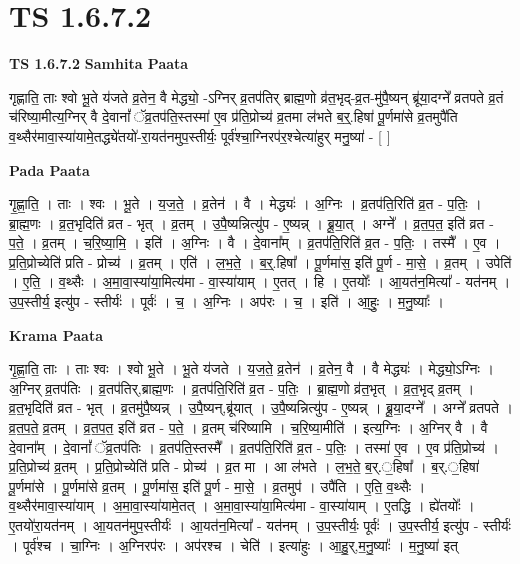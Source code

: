 \documentclass[17pt]{extarticle}
\begin{document}
\section{ TS 1.6.7.2 }

\textbf{TS 1.6.7.2 } \newline
\textbf{Samhita Paata} \newline

गृह्णाति॒ ताः श्वो भू॒ते य॑जते व्र॒तेन॒ वै मेद्ध्यो॒ -ऽग्निर् व्र॒तप॑तिर् ब्राह्म॒णो व्र॑त॒भृद्-व्र॒त-मु॑पै॒ष्यन् ब्रू॑या॒दग्ने᳚ व्रतपते व्र॒तं च॑रिष्या॒मीत्य॒ग्निर् वै दे॒वानां᳚ ॅव्र॒तप॑ति॒स्तस्मा॑ ए॒व प्र॑ति॒प्रोच्य॑ व्र॒तमा ल॑भते ब॒र्॒.हिषा॑ पू॒र्णमा॑से व्र॒तमुपै॑ति व॒थ्सैर॑मावा॒स्या॑यामे॒तद्ध्ये॑तयो॑-रा॒यत॑नमुप॒स्तीर्यः॒ पूर्व॑श्चा॒ग्निरप॑र॒श्चेत्या॑हुर् मनु॒ष्या॑ - [ ] \newline

\textbf{Pada Paata} \newline

गृ॒ह्णा॒ति॒ । ताः । श्वः । भू॒ते । य॒ज॒ते॒ । व्र॒तेन॑ । वै । मेद्ध्यः॑ । अ॒ग्निः । व्र॒तप॑ति॒रिति॑ व्र॒त - प॒तिः॒ । ब्रा॒ह्म॒णः । व्र॒त॒भृदिति॑ व्रत - भृत् । व्र॒तम् । उ॒पै॒ष्यन्नित्यु॑प - ए॒ष्यन्न् । ब्रू॒या॒त् । अग्ने᳚ । व्र॒त॒प॒त॒ इति॑ व्रत - प॒ते॒ । व्र॒तम् । च॒रि॒ष्या॒मि॒ । इति॑ । अ॒ग्निः । वै । दे॒वाना᳚म् । व्र॒तप॑ति॒रिति॑ व्र॒त - प॒तिः॒ । तस्मै᳚ । ए॒व । प्र॒ति॒प्रोच्येति॑ प्रति - प्रोच्य॑ । व्र॒तम् । एति॑ । ल॒भ॒ते॒ । ब॒र्॒.हिषा᳚ । पू॒र्णमा॑स॒ इति॑ पू॒र्ण - मा॒से॒ । व्र॒तम् । उपेति॑ । ए॒ति॒ । व॒थ्सैः । अ॒मा॒वा॒स्या॑या॒मित्य॑मा - वा॒स्या॑याम् । ए॒तत् । हि । ए॒तयोः᳚ । आ॒यत॑न॒मित्या᳚ - यत॑नम् । उ॒प॒स्तीर्य॒ इत्यु॑प - स्तीर्यः॑ । पूर्वः॑ । च॒ । अ॒ग्निः । अप॑रः । च॒ । इति॑ । आ॒हुः॒ । म॒नु॒ष्याः᳚ ।  \newline


\textbf{Krama Paata} \newline

गृ॒ह्णा॒ति॒ ताः । ताः श्वः । श्वो भू॒ते । भू॒ते य॑जते । य॒ज॒ते॒ व्र॒तेन॑ । व्र॒तेन॒ वै । वै मेद्ध्यः॑ । मेद्ध्यो॒ऽग्निः । अ॒ग्निर् व्र॒तप॑तिः । व्र॒तप॑तिर्,ब्राह्म॒णः । व्र॒तप॑ति॒रिति॑ व्र॒त - प॒तिः॒ । ब्रा॒ह्म॒णो व्र॑त॒भृत् । व्र॒त॒भृद् व्र॒तम् । व्र॒त॒भृदिति॑ व्रत - भृत् । व्र॒तमु॑पै॒ष्यन्न् । उ॒पै॒ष्यन्,ब्रू॑यात् । उ॒पै॒ष्यन्नित्यु॑प - ए॒ष्यन्न् । ब्रू॒या॒दग्ने᳚ । अग्ने᳚ व्रतपते । व्र॒त॒प॒ते॒ व्र॒तम् । व्र॒त॒प॒त॒ इति॑ व्रत - प॒ते॒ । व्र॒तम् च॑रिष्यामि । च॒रि॒ष्या॒मीति॑ । इत्य॒ग्निः । अ॒ग्निर् वै । वै दे॒वाना᳚म् । दे॒वानां᳚ ॅव्र॒तप॑तिः । व्र॒तप॑ति॒स्तस्मै᳚ । व्र॒तप॑ति॒रिति॑ व्र॒त - प॒तिः॒ । तस्मा॑ ए॒व । ए॒व प्र॑ति॒प्रोच्य॑ । प्र॒ति॒प्रोच्य॑ व्र॒तम् । प्र॒ति॒प्रोच्येति॑ प्रति - प्रोच्य॑ । व्र॒त मा । आ ल॑भते । ल॒भ॒ते॒ ब॒र्.॒हिषा᳚ । ब॒र्.॒हिषा॑ पू॒र्णमा॑से । पू॒र्णमा॑से व्र॒तम् । पू॒र्णमा॑स॒ इति॑ पू॒र्ण - मा॒से॒ । व्र॒तमुप॑ । उपै॑ति । ए॒ति॒ व॒थ्सैः । व॒थ्सैर॑मावा॒स्या॑याम् । अ॒मा॒वा॒स्या॑यामे॒तत् । अ॒मा॒वा॒स्या॑या॒मित्य॑मा - वा॒स्या॑याम् । ए॒तद्धि । ह्ये॑तयोः᳚ । ए॒तयो॑रा॒यत॑नम् । आ॒यतन॑मुप॒स्तीर्यः॑ । आ॒यत॑न॒मित्या᳚ - यत॑नम् । उ॒प॒स्तीर्यः॒ पूर्वः॑ । उ॒प॒स्तीर्य॒ इत्यु॑प - स्तीर्यः॑ । पूर्व॑श्च । चा॒ग्निः । अ॒ग्निरप॑रः । अप॑रश्च । चेति॑ । इत्या॑हुः । आ॒हु॒र्,म॒नु॒ष्याः᳚ । म॒नु॒ष्या॑ इत् \newline
\end{document}
